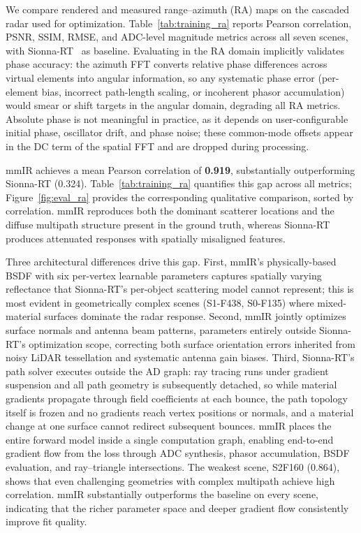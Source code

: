 We compare rendered and measured range--azimuth (RA) maps on the cascaded radar used for optimization. Table~\ref{tab:training_ra} reports Pearson correlation, PSNR, SSIM, RMSE, and ADC-level magnitude metrics across all seven scenes, with Sionna-RT~\cite{sionna} as baseline. Evaluating in the RA domain implicitly validates phase accuracy: the azimuth FFT converts relative phase differences across virtual elements into angular information, so any systematic phase error (per-element bias, incorrect path-length scaling, or incoherent phasor accumulation) would smear or shift targets in the angular domain, degrading all RA metrics. Absolute phase is not meaningful in practice, as it depends on user-configurable initial phase, oscillator drift, and phase noise; these common-mode offsets appear in the DC term of the spatial FFT and are dropped during processing.

mmIR achieves a mean Pearson correlation of \textbf{0.919}, substantially outperforming Sionna-RT (0.324). Table~\ref{tab:training_ra} quantifies this gap across all metrics; Figure~\ref{fig:eval_ra} provides the corresponding qualitative comparison, sorted by correlation. mmIR reproduces both the dominant scatterer locations and the diffuse multipath structure present in the ground truth, whereas Sionna-RT produces attenuated responses with spatially misaligned features.

Three architectural differences drive this gap. First, mmIR's physically-based BSDF with six per-vertex learnable parameters captures spatially varying reflectance that Sionna-RT's per-object scattering model cannot represent; this is most evident in geometrically complex scenes (S1-F438, S0-F135) where mixed-material surfaces dominate the radar response. Second, mmIR jointly optimizes surface normals and antenna beam patterns, parameters entirely outside Sionna-RT's optimization scope, correcting both surface orientation errors inherited from noisy LiDAR tessellation and systematic antenna gain biases. Third, Sionna-RT's path solver executes outside the AD graph: ray tracing runs under gradient suspension and all path geometry is subsequently detached, so while material gradients propagate through field coefficients at each bounce, the path topology itself is frozen and no gradients reach vertex positions or normals, and a material change at one surface cannot redirect subsequent bounces. mmIR places the entire forward model inside a single computation graph, enabling end-to-end gradient flow from the loss through ADC synthesis, phasor accumulation, BSDF evaluation, and ray--triangle intersections. The weakest scene, S2F160 (0.864), shows that even challenging geometries with complex multipath achieve high correlation. mmIR substantially outperforms the baseline on every scene, indicating that the richer parameter space and deeper gradient flow consistently improve fit quality.

